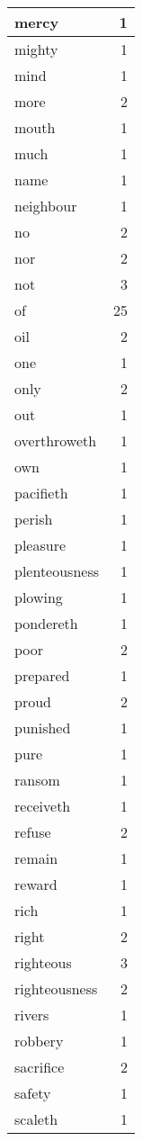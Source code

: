 \begin{center}
\begin{longtable}{l|r}
mercy & 1\\ \hline 
mighty & 1\\ \hline 
mind & 1\\ \hline 
more & 2\\ \hline 
mouth & 1\\ \hline 
much & 1\\ \hline 
name & 1\\ \hline 
neighbour & 1\\ \hline 
no & 2\\ \hline 
nor & 2\\ \hline 
not & 3\\ \hline 
of & 25\\ \hline 
oil & 2\\ \hline 
one & 1\\ \hline 
only & 2\\ \hline 
out & 1\\ \hline 
overthroweth & 1\\ \hline 
own & 1\\ \hline 
pacifieth & 1\\ \hline 
perish & 1\\ \hline 
pleasure & 1\\ \hline 
plenteousness & 1\\ \hline 
plowing & 1\\ \hline 
pondereth & 1\\ \hline 
poor & 2\\ \hline 
prepared & 1\\ \hline 
proud & 2\\ \hline 
punished & 1\\ \hline 
pure & 1\\ \hline 
ransom & 1\\ \hline 
receiveth & 1\\ \hline 
refuse & 2\\ \hline 
remain & 1\\ \hline 
reward & 1\\ \hline 
rich & 1\\ \hline 
right & 2\\ \hline 
righteous & 3\\ \hline 
righteousness & 2\\ \hline 
rivers & 1\\ \hline 
robbery & 1\\ \hline 
sacrifice & 2\\ \hline 
safety & 1\\ \hline 
scaleth & 1\\ \hline 

\end{longtable}
\end{center}
